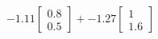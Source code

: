 \documentclass[preview]{standalone}
\begin{document}
\begin{align*}
-1.11 \begin{bmatrix} 0.8 \\ 0.5 \end{bmatrix} + -1.27 \begin{bmatrix} 1 \\ 1.6 \end{bmatrix}
\end{align*}
\end{document}
